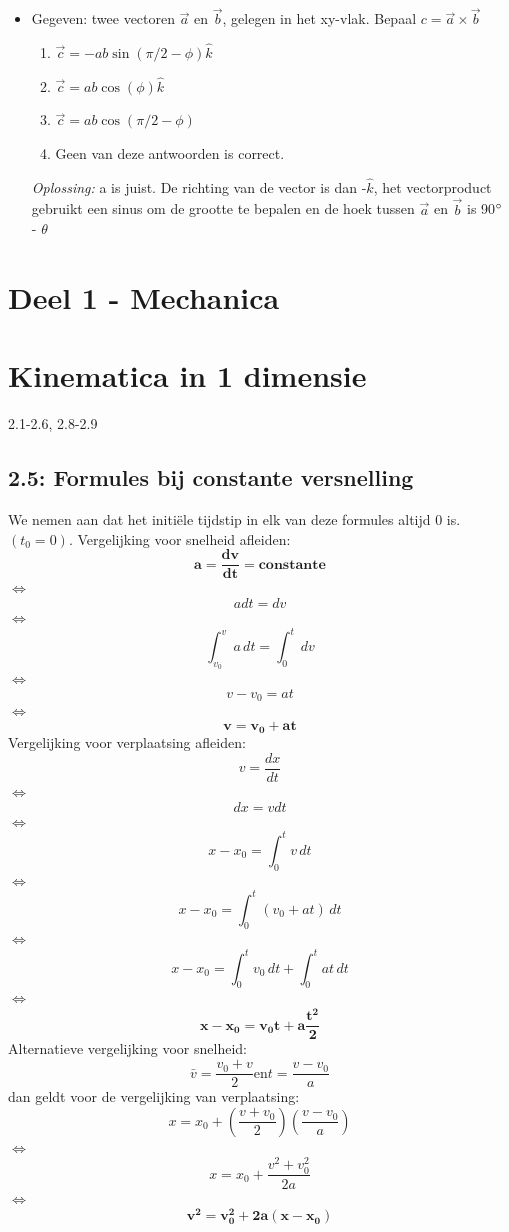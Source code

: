 \documentclass[12pt,a4paper]{article}
\begin{document}
\begin{itemize}
        \item Gegeven: twee vectoren $\vec{a}$ en $\vec{b}$, gelegen in het xy-vlak.
        Bepaal \(c = \vec{a} \times \vec{b}\)
        \begin{enumerate}
            [label=\alph*)]
            \item \(\vec{c} = - ab \sin(\pi/2 - \phi)\hat{k}\)
            \item \(\vec{c} = ab \cos(\phi)\hat{k}\)
            \item \(\vec{c} = ab \cos(\pi/2 - \phi)\)
            \item Geen van deze antwoorden is correct.
        \end{enumerate}
        \textit{Oplossing:} a is juist. De richting van de vector is dan -$\hat{k}$, het vectorproduct gebruikt een sinus om de grootte te bepalen en de hoek tussen $\vec{a}$ en $\vec{b}$ is 90$\degree$ - $\theta$
    \end{itemize}


    \section{Deel 1 - Mechanica}


    \section{Kinematica in 1 dimensie}
    2.1-2.6, 2.8-2.9

    \subsection{2.5: Formules bij constante versnelling}
    We nemen aan dat het initiële tijdstip in elk van deze formules altijd 0 is. \((t_{0} = 0)\).
    Vergelijking voor snelheid afleiden:
    \[\mathbf{a = \frac{dv}{dt} = constante}\]
    $\iff$ \[a dt = dv\]
    $\iff$ \[\int_{v_0}^{v} a \, dt = \int_{0}^{t} \,dv\]
    $\iff$\[v - v_0 = at\]
    $\iff$\[\mathbf{v = v_0 + at}\]
    Vergelijking voor verplaatsing afleiden:
    \[v = \frac{dx}{dt}\]
    $\iff$\[dx = v dt\]
    $\iff$\[x - x_0 = \int_{0}^{t} v \, dt\]
    $\iff$\[x - x_0 = \int_{0}^{t} (v_0 + at) \, dt\]
    $\iff$\[x - x_0 = \int_{0}^{t} v_0 \, dt + \int_{0}^{t} at \, dt\]
    $\iff$\[\mathbf{x - x_0 = v_0t + a\frac{t^2}{2}}\]
    Alternatieve vergelijking voor snelheid:
    \[\bar{v} = \frac{v_0 + v}{2} \text{en} t = \frac{v - v_0}{a}\]
    dan geldt voor de vergelijking van verplaatsing:
    \[x = x_0 + (\frac{v + v_0}{2})(\frac{v - v_0}{a})\]
    $\iff$\[x = x_0 + \frac{v^2 + v_0^2}{2a}\]
    $\iff$\[\mathbf{v^2 = v_0^2 + 2a(x - x_0)}\]
\end{document}
